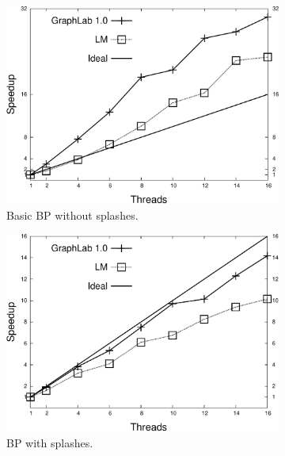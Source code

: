 \begin{figure}[ht]
   \centering
   \begin{subfigure}[b]{0.3\textwidth}
      \includegraphics[width=\textwidth]{new-benchmarks/speedup_bp-graphlab-400.pdf}
      \caption{Basic BP without splashes.\newline}
   \end{subfigure}
   \begin{subfigure}[b]{0.3\textwidth}
      \includegraphics[width=\textwidth]{new-benchmarks/speedup2_bp-graphlab-400.pdf}
      \caption{BP with splashes.\newline}
   \end{subfigure}
   \begin{subfigure}[b]{0.3\textwidth}

\end{subfigure}
\end{figure}
